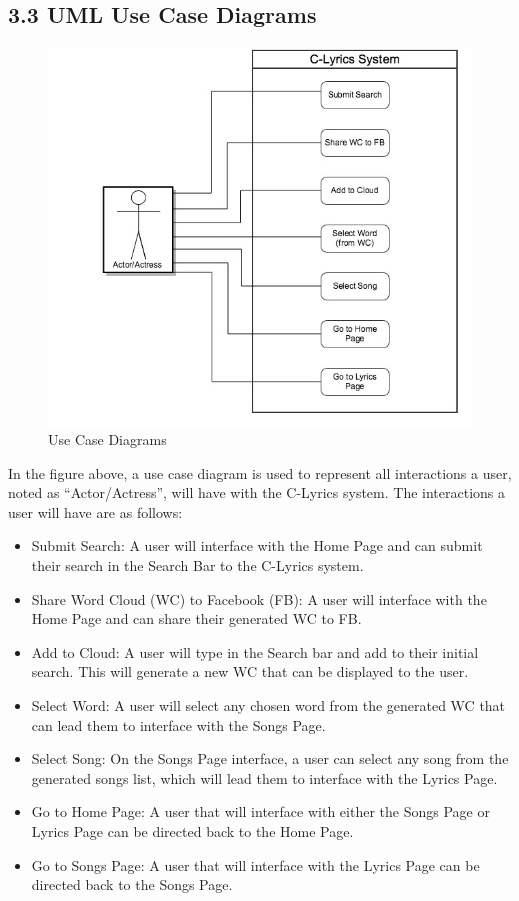\documentclass[]{article}
\begin{document}
\subsection{3.3 UML Use Case Diagrams}\label{uml-use-case-diagrams}

\begin{figure}[htbp]
\centering
\includegraphics{use_case.jpg}
\caption{Use Case Diagrams}
\end{figure}

In the figure above, a use case diagram is used to represent all
interactions a user, noted as ``Actor/Actress'', will have with the
C-Lyrics system. The interactions a user will have are as follows:

\begin{itemize}
\itemsep1pt\parskip0pt
\item
  Submit Search: A user will interface with the Home Page and can submit
  their search in the Search Bar to the C-Lyrics system.
\item
  Share Word Cloud (WC) to Facebook (FB): A user will interface with the
  Home Page and can share their generated WC to FB.
\item
  Add to Cloud: A user will type in the Search bar and add to their
  initial search. This will generate a new WC that can be displayed to
  the user.
\item
  Select Word: A user will select any chosen word from the generated WC
  that can lead them to interface with the Songs Page.
\item
  Select Song: On the Songs Page interface, a user can select any song
  from the generated songs list, which will lead them to interface with
  the Lyrics Page.
\item
  Go to Home Page: A user that will interface with either the Songs Page
  or Lyrics Page can be directed back to the Home Page.
\item
  Go to Songs Page: A user that will interface with the Lyrics Page can
  be directed back to the Songs Page.
\end{itemize}
\end{document}
